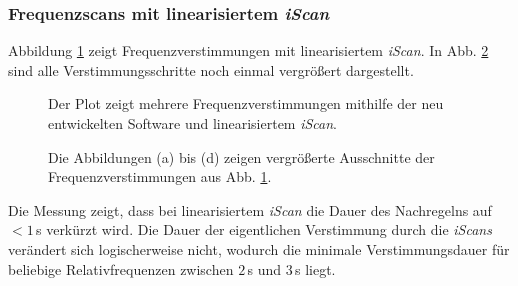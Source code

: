 \subsubsection{Frequenzscans mit linearisiertem
\textit{iScan}}\label{subsubsec:frequenz_scans_lineares_iScan}
Abbildung \ref{fig:laserscan_LUT-kalibriert} zeigt
Frequenzverstimmungen mit linearisiertem \textit{iScan}. In Abb.
\ref{fig:laserscan_LUT-kalibriert_zoom} sind alle Verstimmungsschritte noch
einmal vergrößert dargestellt.
\begin{figure}[h]
	 	\centering
	 	\footnotesize
 		
		\caption[Frequenzscan, linearisiertes \textit{iScan}]{Der Plot zeigt mehrere
		Frequenzverstimmungen mithilfe der neu entwickelten Software und
		linearisiertem \textit{iScan}.}
		\label{fig:laserscan_LUT-kalibriert}
\end{figure}
\begin{figure}[hp]
 	\centering
 	\footnotesize
	\caption[Frequenzscan, nichtlineares \textit{iScan}, vergrößert]{Die
	Abbildungen (a) bis (d) zeigen vergrößerte Ausschnitte der
	Frequenzverstimmungen aus Abb. \ref{fig:laserscan_LUT-kalibriert}.}
	\label{fig:laserscan_LUT-kalibriert_zoom}
\end{figure}
Die Messung zeigt, dass bei linearisiertem \textit{iScan} die Dauer des
Nachregelns auf $<1\,$s verkürzt wird. Die Dauer der eigentlichen
Verstimmung durch die \textit{iScans} verändert sich logischerweise nicht,
wodurch die minimale Verstimmungsdauer für beliebige Relativfrequenzen zwischen
$2\,$s und $3\,$s liegt.

